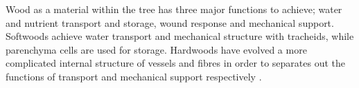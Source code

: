 Wood as a material within the tree has three major functions to achieve; water
and nutrient transport and storage, wound response and mechanical support. Softwoods
achieve water transport and mechanical structure with tracheids, while
parenchyma cells are used for storage. Hardwoods have evolved a more
complicated internal structure of vessels and fibres in order to separates out
the functions of transport and mechanical support respectively \citep{walker1993primary}.